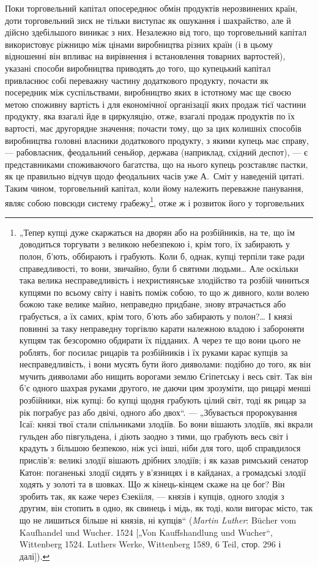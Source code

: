 
Поки торговельний капітал опосереднює обмін продуктів
нерозвинених країн, доти торговельний зиск не тільки виступає
як ошукання і шахрайство, але й дійсно здебільшого виникає з них.
Незалежно від того, що торговельний капітал використовує ріжницю
між цінами виробництва різних країн (і в цьому відношенні
він впливає на вирівнення і встановлення товарних вартостей),
указані способи виробництва приводять до того, що
купецький капітал привласнює собі переважну частину додаткового
продукту, почасти як посередник між суспільствами, виробництво
яких в істотному має ще своєю метою споживну вартість
і для економічної організації яких продаж тієї частини продукту,
яка взагалі йде в циркуляцію, отже, взагалі продаж продуктів по
їх вартості, має другорядне значення; почасти тому, що за цих
колишніх способів виробництва головні власники додаткового
продукту, з якими купець має справу, — рабовласник, феодальний
сеньйор, держава (наприклад, східний деспот), — є представниками
споживаючого багатства, що на нього купець розставляє
пастки, як це правильно відчув щодо феодальних часів
уже А.~Сміт у наведеній цитаті. Таким чином, торговельний капітал,
коли йому належить переважне панування, являє собою повсюди
систему грабежу\footnote{
„Тепер купці дуже скаржаться на дворян або на розбійників, на те, що
їм доводиться торгувати з великою небезпекою і, крім того, їх забирають у полон,
б’ють, оббирають і грабують. Коли б, однак, купці терпіли таке ради
справедливості, то вони, звичайно, були б святими людьми\dots{} Але оскільки така
велика несправедливість і нехристиянське злодійство та розбій чиниться купцями
по всьому світу і навіть поміж собою, то що ж дивного, коли волею
божою таке велике майно, неправедно придбане, знову втрачається або
грабується, а їх самих, крім того, б’ють або забирають у полон?\dots{} І князі
повинні за таку неправедну торгівлю карати належною владою і забороняти
купцям так безсоромно обдирати їх підданих. А через те що вони цього не
роблять, бог посилає рицарів та розбійників і їх руками карає купців за несправедливість,
і вони мусять бути його дияволами: подібно до того, як він мучить
дияволами або нищить ворогами землю Єгіпетську і весь світ. Так він б’є
одного шахрая руками другого, не даючи цим зрозуміти, що рицарі менші
розбійники, ніж купці: бо купці щодня грабують цілий світ, тоді як рицар за рік
пограбує раз або двічі, одного або двох“. — „Збувається пророкування Ісаї:
князі твої стали спільниками злодіїв. Бо вони вішають злодіїв, які вкрали гульден
або півгульдена, і діють заодно з тими, що грабують весь світ і крадуть
з більшою безпекою, ніж усі інші, ніби для того, щоб справдилося прислів’я:
великі злодії вішають дрібних злодіїв; і як казав римський сенатор Катон: поганенькі
злодії сидять у в’язницях і в кайданах, а громадські злодії ходять
у золоті та в шовках. Що ж кінець-кінцем скаже на це бог? Він зробить так,
як каже через Єзекііля, — князів і купців, одного злодія з другим, він стопить
в одно, як свинець і мідь, як тоді, коли вигорає місто, так що не лишиться більше
ні князів, ні купців“ (\emph{Martin Luther}: Bücher vom Kaufhandel und Wucher. 1524
[„Von Kauffshandlung und Wucher“, Wittenberg 1524. Luthers Werke, Wittenberg
1589, 6 Teil, стор. 296 і далі]).
}, отже ж і розвиток його у торговельних
